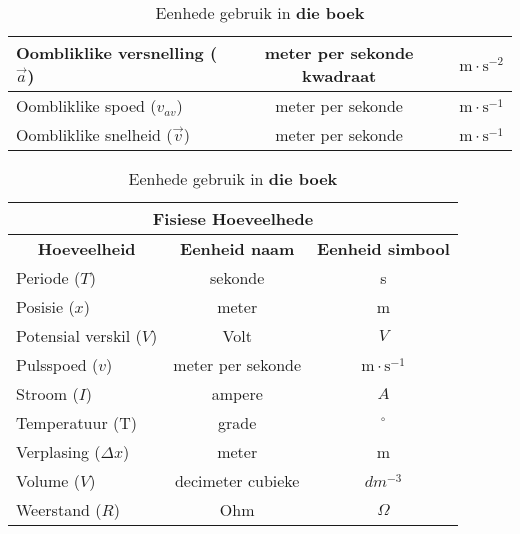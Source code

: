 {\begin{table}[H]
\begin{center}
\begin{tabular}{|l|c|c|}
Oombliklike versnelling ($\vec{a}$)  & meter per sekonde kwadraat & $\text{m} \cdot \text{s}^{-2}$ \\ \hline
Oombliklike spoed (${v}_{av}$)      & meter per sekonde & $\text{m} \cdot \text{s}^{-1}$  \\ \hline
Oombliklike snelheid ($\vec{v}$)       & meter per sekonde & $\text{m} \cdot \text{s}^{-1}$  \\ \hline
\end{tabular}
\end{center}
\caption{Eenhede gebruik in \textbf{die boek}  }
\label{table:book::units1}
\end{table}
\begin{table}[H]
\begin{center}
\begin{tabular}{|l|c|c|}\hline \hline 
\multicolumn{3}{|c|}{\textbf{Fisiese Hoeveelhede}}\\ \hline \hline
\multicolumn{1}{|c|}{\textbf{Hoeveelheid}} & \textbf{Eenheid naam} & \textbf{Eenheid simbool}\\ \hline
Periode ($T$)             & sekonde &  s                               \\ \hline
Posisie ($x$)             & meter & m                               \\ \hline 
Potensial verskil ($V$)            & Volt & $V$   \\ \hline
Pulsspoed ($v$)             & meter per sekonde & $\text{m} \cdot \text{s}^{-1}$ \\ \hline
Stroom ($I$)             & ampere & $A$                             \\ \hline
Temperatuur (T)               & grade & $^{\circ}$ \\ \hline
Verplasing ($\Delta x$)      & meter  & m                                \\ \hline
Volume ($V$)             & decimeter cubieke & $dm^{-3}$  \\ \hline
Weerstand  ($R$)             & Ohm & $\Omega$ \\ \hline 
\end{tabular}
\end{center}
\caption{Eenhede gebruik in \textbf{die boek} }
\label{table:book::units2}
\end{table}}
